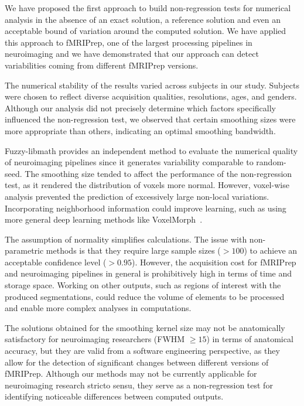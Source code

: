 \documentclass{article}
\newcommand{\fmriprep}{fMRIPrep\xspace}
\begin{document}
We have proposed the first approach to build non-regression tests for numerical analysis in the absence of an exact solution, a reference solution and even an acceptable bound of variation around the computed solution. We have applied this approach to \fmriprep, one of the largest processing pipelines in neuroimaging and we have demonstrated that our approach can detect variabilities coming from different \fmriprep versions.

The numerical stability of the results varied across subjects in our study. Subjects were chosen to reflect diverse acquisition qualities, resolutions, ages, and genders. Although our analysis did not precisely determine which factors specifically influenced the non-regression test, we observed that certain smoothing sizes were more appropriate than others, indicating an optimal smoothing bandwidth.

Fuzzy-libmath provides an independent method to evaluate the numerical quality of neuroimaging pipelines since it generates variability comparable to random-seed. The smoothing size tended to affect the performance of the non-regression test, as it rendered the distribution of voxels more normal. However, voxel-wise analysis prevented the prediction of excessively large non-local variations. Incorporating neighborhood information could improve learning, such as using more general deep learning methods like VoxelMorph~\cite{balakrishnan2019voxelmorph}.

The assumption of normality simplifies calculations. The issue with non-parametric methods is that they require large sample sizes ($>100$) to achieve an acceptable confidence level ($>0.95$). However, the acquisition cost for \fmriprep and neuroimaging pipelines in general is prohibitively high in terms of time and storage space. Working on other outputs, such as regions of interest with the produced segmentations, could reduce the volume of elements to be processed and enable more complex analyses in computations.

The solutions obtained for the smoothing kernel size may not be anatomically satisfactory for neuroimaging researchers (FWHM $\geq 15$) in terms of anatomical accuracy, but they are valid from a software engineering perspective, as they allow for the detection of significant changes between different versions of \fmriprep. Although our methods may not be currently applicable for neuroimaging research stricto sensu, they serve as a non-regression test for identifying noticeable differences between computed outputs.
\end{document}
